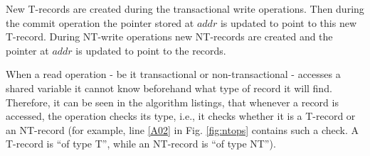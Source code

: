 New T-records are created during the transactional write operations.
Then during
the commit operation the pointer stored at $\mathit{addr}$ is updated to point to this new T-record.
During NT-write operations new NT-records are created and the pointer at $\mathit{addr}$
is updated to point to the records.

When a read operation - be it transactional or non-transactional - accesses 
a shared variable it cannot know beforehand what type of record it will find. 
Therefore, it can be seen in the algorithm listings, that whenever 
a record is accessed, 
the operation checks its type, i.e., it checks 
whether it is a T-record or an NT-record (for example, line \ref{A02} in Fig.
\ref{fig:ntops} contains such a check. A T-record is {}``of type T'', while an 
NT-record is {}``of type NT''). 


